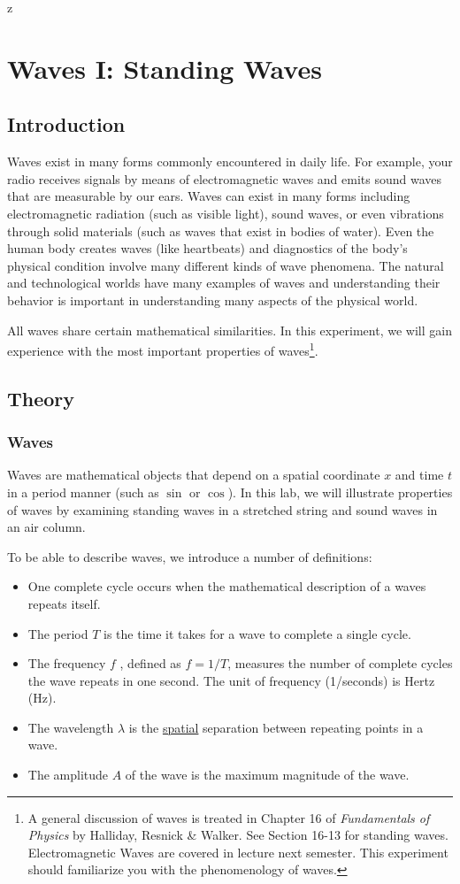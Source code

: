  z\chapter{Waves I: Standing Waves}
\label{chap:waves}
\section{Introduction}
Waves exist in many forms commonly encountered in daily life. For example, your radio receives signals by means of electromagnetic waves and emits sound waves that are measurable by our ears. Waves can exist in many forms including electromagnetic radiation (such as visible light), sound waves, or even vibrations through solid materials (such as waves that exist in bodies of water). Even the human body creates waves (like heartbeats) and diagnostics of the body's physical condition involve many different kinds of wave phenomena. The natural and technological worlds have many examples of waves and understanding their behavior is important in understanding many aspects of the physical world. \myskip

All waves share certain mathematical similarities. In this experiment, we will gain experience with the most important properties of waves\footnote{A general discussion of waves is treated in Chapter 16 of \emph{Fundamentals of Physics} by Halliday, Resnick \& Walker. See Section 16-13 for standing waves. Electromagnetic Waves are covered in lecture next semester. This experiment should familiarize you with the phenomenology of waves.}.

\section{Theory}
\subsection{Waves}
Waves are mathematical objects that depend on a spatial coordinate $x$ and time $t$ in a period manner (such as $\sin$ or $\cos$). In this lab, we will illustrate properties of waves by examining standing waves in a stretched string and sound waves in an air column. \myskip

To be able to describe waves, we introduce a number of definitions:
\begin{itemize}
\item One complete cycle occurs when the mathematical description of a waves repeats itself.
\item The period $T$ is the time it takes for a wave to complete a single cycle. 
\item The frequency $f$ , defined as $f = 1/T$, measures the number of complete cycles the wave repeats in one second. The unit of frequency (1/seconds) is Hertz (Hz).
\item The wavelength $\lambda$ is the \underline{spatial} separation between repeating points in a wave.
\item The amplitude $A$ of the wave is the maximum magnitude of the wave.
\end{itemize}

